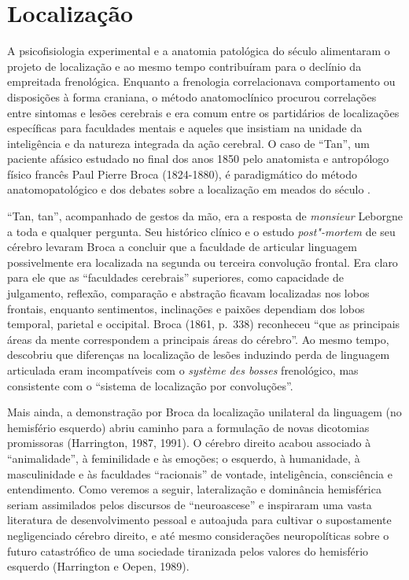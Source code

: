 \section{Localização}

A psicofisiologia experimental e a anatomia patológica do século 
alimentaram o projeto de localização e ao mesmo tempo contribuíram para
o declínio da empreitada frenológica. Enquanto a frenologia
correlacionava comportamento ou disposições à forma craniana, o método
anatomoclínico procurou correlações entre sintomas e lesões cerebrais e
era comum entre os partidários de localizações específicas para faculdades
mentais e aqueles que insistiam na unidade da inteligência e da
natureza integrada da ação cerebral. O caso de ``Tan'', um paciente
afásico estudado no final dos anos 1850 pelo anatomista e antropólogo
físico francês Paul Pierre Broca (1824-1880), é paradigmático do método
anatomopatológico e dos debates sobre a localização em meados do século
.

``Tan, tan'', acompanhado de gestos da mão, era a resposta de
\emph{monsieur} Leborgne a toda e qualquer pergunta. Seu histórico
clínico e o estudo \emph{post"-mortem} de seu cérebro levaram Broca a
concluir que a faculdade de articular linguagem possivelmente era
localizada na segunda ou terceira convolução frontal. Era claro para ele
que as ``faculdades cerebrais'' superiores, como capacidade de
julgamento, reflexão, comparação e abstração ficavam localizadas nos
lobos frontais, enquanto sentimentos, inclinações e paixões dependiam
dos lobos temporal, parietal e occipital. Broca (1861, p.~338) reconheceu
``que as principais áreas da mente correspondem a principais áreas do
cérebro''. Ao mesmo tempo, descobriu que diferenças na localização de
lesões induzindo perda de linguagem articulada eram incompatíveis com o
\emph{système des bosses} frenológico, mas consistente com o ``sistema
de localização por convoluções''.

Mais ainda, a demonstração por Broca da localização unilateral da
linguagem (no hemisfério esquerdo) abriu caminho para a formulação de
novas dicotomias promissoras (Harrington, 1987, 1991). O cérebro direito
acabou associado à ``animalidade'', à feminilidade e às emoções; o
esquerdo, à humanidade, à masculinidade e às faculdades ``racionais'' de
vontade, inteligência, consciência e entendimento. Como veremos a
seguir, lateralização e dominância hemisférica seriam assimilados pelos
discursos de ``neuroascese'' e inspiraram uma vasta literatura de
desenvolvimento pessoal e autoajuda para cultivar o supostamente
negligenciado cérebro direito, e até mesmo considerações neuropolíticas
sobre o futuro catastrófico de uma sociedade tiranizada pelos valores do
hemisfério esquerdo (Harrington e Oepen, 1989).

